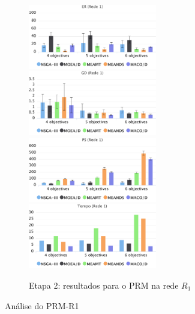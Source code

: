 \begin{figure}[!htbp]
	\caption{Etapa 2: resultados para o PRM na rede $R_1$}
	\label{fig_exp2_mrp_r1}
	\includegraphics[width=0.5\textwidth]{cap_experimentos/figs/etapa2/er-mrp-r1}
	\includegraphics[width=0.5\textwidth]{cap_experimentos/figs/etapa2/gd-mrp-r1}
	\includegraphics[width=0.5\textwidth]{cap_experimentos/figs/etapa2/ps-mrp-r1}
	\includegraphics[width=0.5\textwidth]{cap_experimentos/figs/etapa2/time-mrp-r1}
\end{figure}

Análise do PRM-R1

